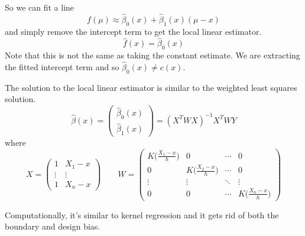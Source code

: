   So we can fit a line 
  \begin{equation}
    f(\mu) \approx \hat{\beta}_0 (x) + \hat{\beta}_1 (x) (\mu - x)
  \end{equation}
  and simply remove the intercept term to get the local linear estimator. 
  \begin{equation}
    \hat{f}(x) = \hat{\beta}_0 (x)
  \end{equation}
  Note that this is not the same as taking the constant estimate. We are extracting the fitted intercept term and so $\hat{\beta}_0(x) \neq c(x)$. 

  \begin{theorem}
    The solution to the local linear estimator is similar to the weighted least squares solution. 
    \begin{equation}
      \hat{\beta}(x) = \begin{pmatrix} \hat{\beta}_0 (x) \\ \hat{\beta}_1 (x) \end{pmatrix} = (X^T W X)^{-1} X^T W Y
    \end{equation}
    where 
    \begin{equation}
      X = \begin{pmatrix} 1 & X_1 - x \\ \vdots & \vdots \\ 1 & X_n - x \end{pmatrix} \qquad W = \begin{pmatrix} K \bigg( \frac{X_1 - x}{h} \bigg) & 0 & \cdots & 0 \\ 0 & K \bigg( \frac{X_2 - x}{h} \bigg) & \cdots & 0 \\ \vdots & \vdots & \ddots & \vdots \\ 0 & 0 & \cdots & K \bigg( \frac{X_n - x}{h} \bigg) \end{pmatrix}
    \end{equation}
  \end{theorem}

  Computationally, it's similar to kernel regression and it gets rid of both the boundary and design bias. 

